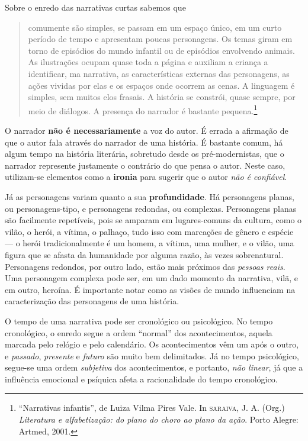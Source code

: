 \documentclass[11pt]{extarticle}
\begin{document}
Sobre o enredo das narrativas curtas sabemos que

\begin{quote}
comumente são simples, se passam em um espaço único, em um curto período de tempo e apresentam poucas personagens. Os temas giram em torno de episódios do mundo infantil ou de episódios envolvendo animais. As ilustrações ocupam quase toda a página e auxiliam 
a criança a identificar, ma narrativa, as características externas das personagens, as ações vividas por elas e os espaços onde ocorrem as cenas. A linguagem é simples, sem muitos elos frasais. A história se constrói, quase sempre, por meio de diálogos. A presença do narrador é bastante pequena.\footnote{“Narrativas infantis”, de Luiza Vilma Pires Vale. In \textsc{saraiva}, J. A. (Org.) \textit{Literatura e alfabetização: do plano do choro ao plano da ação}. Porto Alegre: Artmed, 2001.}  
\end{quote}

O narrador \textbf{não é necessariamente} a voz do autor. É errada a afirmação de que o autor fala através do narrador de uma história. É bastante comum, há algum tempo na história literária, sobretudo desde os pré-modernistas, que o narrador represente justamente o contrário do que pensa o autor. Neste caso, utilizam-se elementos como a \textbf{ironia} para sugerir que o autor \textit{não é confiável}.

Já as personagens variam quanto a sua \textbf{profundidade}. Há personagens planas, ou personagens-tipo, e personagens redondas, ou complexas. Personagens planas são facilmente repetíveis, pois se amparam em lugares-comuns da cultura, como o vilão, o herói, a vítima, o palhaço, tudo isso com marcações de gênero e espécie --- o herói tradicionalmente é um homem, a vítima, uma mulher, e o vilão, uma figura que se afasta da humanidade por alguma razão, às vezes sobrenatural. Personagens redondos, por outro lado, estão mais próximos das \textit{pessoas reais}. Uma personagem complexa pode ser, em um dado momento da narrativa, vilã, e em outro, heroína. É importante notar como as visões de mundo influenciam na caracterização das personagens de uma história.

O tempo de uma narrativa pode ser cronológico ou psicológico. No tempo cronológico, o enredo segue a ordem ``normal'' dos acontecimentos, aquela marcada pelo relógio e pelo calendário. Os acontecimentos vêm um após o outro, e \textit{passado}, \textit{presente} e \textit{futuro} são muito bem delimitados. Já no tempo psicológico, segue-se uma ordem \textit{subjetiva} dos acontecimentos, e portanto, \textit{não linear}, já que a influência emocional e psíquica afeta a racionalidade do tempo cronológico. 
\end{document}
